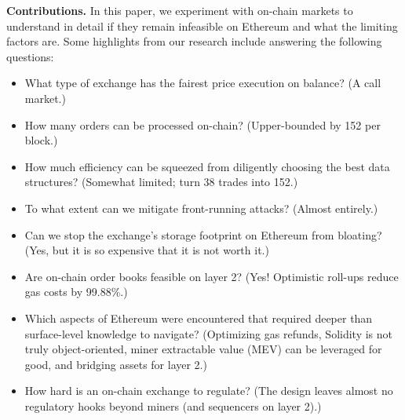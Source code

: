 \textbf{Contributions.} In this paper, we experiment with on-chain markets to understand in detail if they remain infeasible on Ethereum and what the limiting factors are. Some highlights from our research include answering the following questions:
\begin{itemize}
\item What type of exchange has the fairest price execution on balance? (A call market.)
\item How many orders can be processed on-chain? (Upper-bounded by 152 per block.)
\item How much efficiency can be squeezed from diligently choosing the best data structures? (Somewhat limited; turn 38 trades into 152.)
\item To what extent can we mitigate front-running attacks? (Almost entirely.)
\item Can we stop the exchange's storage footprint on Ethereum from bloating? (Yes, but it is so expensive that it is not worth it.)
\item Are on-chain order books feasible on layer 2? (Yes! Optimistic roll-ups reduce gas costs by 99.88\%.)
\item Which aspects of Ethereum were encountered that required deeper than surface-level knowledge to navigate? (Optimizing gas refunds, Solidity is not truly object-oriented, miner extractable value (MEV) can be leveraged for good, and bridging assets for layer 2.)
\item How hard is an on-chain exchange to regulate? (The design leaves almost no regulatory hooks beyond miners (and sequencers on layer 2).)
\end{itemize}


 


